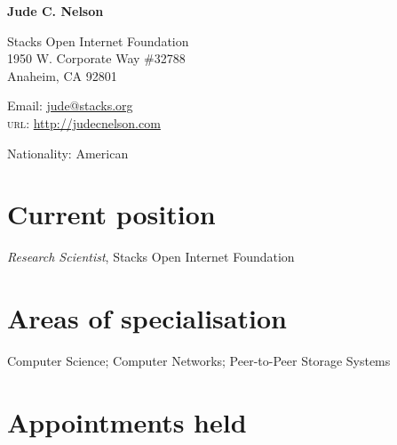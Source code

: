 \documentclass[11pt]{article} %
\begin{document}

{\LARGE\bfseries Jude C. Nelson} %
\bigskip\bigskip\medskip %

Stacks Open Internet Foundation\\ %
1950 W. Corporate Way \#32788\\
Anaheim, CA 92801
\medskip %

Email: \href{mailto:jude@stacks.org}{jude@stacks.org}\\ %
\textsc{url}: \href{http://judecnelson.com}{http://judecnelson.com}\\ %

\vspace{0.06\textheight} %


Nationality: American


\section*{Current position}

\emph{Research Scientist}, Stacks Open Internet Foundation


\section*{Areas of specialisation}

Computer Science; Computer Networks; Peer-to-Peer Storage Systems


\section*{Appointments held}
\end{document}
